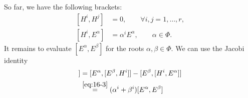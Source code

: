 So far, we have the following brackets:
\begin{subequations}
  \begin{align}
    [H^{i}, H^{j}] &= 0, \qquad \forall i , j = 1, \dots, r, \\
    [H^{i}, E^{\alpha}] &= \alpha^{i} E^{\alpha}, \qquad \alpha \in \Phi.
  \end{align}
\end{subequations}
It remains to evaluate $[E^{\alpha}, E^{\beta}]$ for the roots $\alpha, \beta \in \Phi$.
We can use the Jacobi identity
\begin{align}
[H^{i}, [E^{\alpha}, E^{\beta}]] &= [E^{\alpha}, [E^{\beta}, H^{i}]] - [E^{\beta}, [H^{i}, E^{\alpha}]] \\
				   &\stackrel{\eqref{eq:16-3}}{=} (\alpha^{i} + \beta^{i}) [E^{\alpha}, E^{\beta}]
\end{align}
